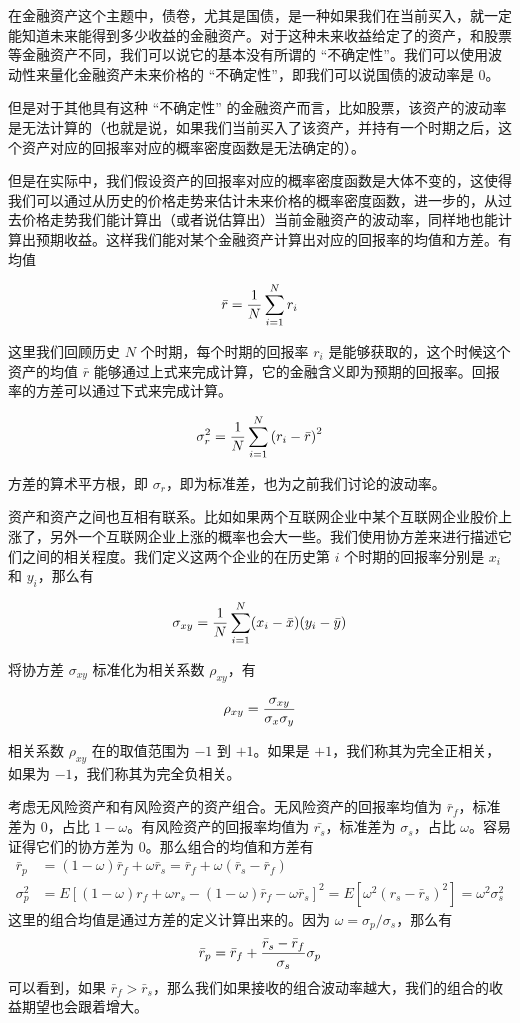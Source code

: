 \documentclass[utf8,a4paper,nofonts]{ctexbook}
\begin{document}
在金融资产这个主题中，债卷，尤其是国债，是一种如果我们在当前买入，就一定能知道未来能得到多少收益的金融资产。对于这种未来收益给定了的资产，和股票等金融资产不同，我们可以说它的基本没有所谓的 “不确定性”。我们可以使用波动性来量化金融资产未来价格的 “不确定性”，即我们可以说国债的波动率是 0。

但是对于其他具有这种 “不确定性” 的金融资产而言，比如股票，该资产的波动率是无法计算的（也就是说，如果我们当前买入了该资产，并持有一个时期之后，这个资产对应的回报率对应的概率密度函数是无法确定的）。

但是在实际中，我们假设资产的回报率对应的概率密度函数是大体不变的，这使得我们可以通过从历史的价格走势来估计未来价格的概率密度函数，进一步的，从过去价格走势我们能计算出（或者说估算出）当前金融资产的波动率，同样地也能计算出预期收益。这样我们能对某个金融资产计算出对应的回报率的均值和方差。有均值

$$
\bar{r} = {1 \over N}\sum_{i = 1}^{N} r_i
$$

这里我们回顾历史 $N$ 个时期，每个时期的回报率 $r_i$ 是能够获取的，这个时候这个资产的均值 $\bar{r}$ 能够通过上式来完成计算，它的金融含义即为预期的回报率。回报率的方差可以通过下式来完成计算。

$$
\sigma_r^2 = {1 \over N}\sum_{i = 1}^{N} \left( r_i - \bar{r} \right)^2
$$

方差的算术平方根，即 $\sigma_r$，即为标准差，也为之前我们讨论的波动率。

资产和资产之间也互相有联系。比如如果两个互联网企业中某个互联网企业股价上涨了，另外一个互联网企业上涨的概率也会大一些。我们使用协方差来进行描述它们之间的相关程度。我们定义这两个企业的在历史第 $i$ 个时期的回报率分别是 $x_i$ 和 $y_i$，那么有

$$
\sigma_{xy} = {1 \over N} \sum_{i = 1}^{N} (x_i - \bar{x}) (y_i - \bar{y})
$$

将协方差 $\sigma_{xy}$ 标准化为相关系数 $\rho_{xy}$，有

$$
\rho_{xy} = {\sigma_{xy} \over \sigma_x \sigma_y}
$$

相关系数 $\rho_{xy}$ 在的取值范围为 $-1$ 到 $+1$。如果是 $+1$，我们称其为完全正相关，如果为 $-1$，我们称其为完全负相关。

考虑无风险资产和有风险资产的资产组合。无风险资产的回报率均值为 $\bar{r}_f$，标准差为 $0$，占比 $1 - \omega$。有风险资产的回报率均值为 $\bar{r_s}$，标准差为 $\sigma_s$，占比 $\omega$。容易证得它们的协方差为 $0$。那么组合的均值和方差有
\begin{align*}
    \bar{r}_p  & = (1 - \omega) \bar{r}_f + \omega \bar{r}_s = \bar{r}_f + \omega(\bar{r}_s - \bar{r}_f) \\
    \sigma_p^2 & = E\left[ (1 - \omega) r_f + \omega r_s - (1 - \omega) \bar{r}_f - \omega \bar{r}_s \right]^2 = E\left[ \omega^2 (r_s - \bar{r}_s)^2 \right] = \omega^2 \sigma_s^2
\end{align*}
这里的组合均值是通过方差的定义计算出来的。因为 $\omega = \sigma_p / \sigma_s$，那么有
\[
    \bar{r}_p = \bar{r}_f + {\bar{r}_s - \bar{r}_f \over \sigma_s} \sigma_p
\]
可以看到，如果 $\bar{r}_f > \bar{r}_s$，那么我们如果接收的组合波动率越大，我们的组合的收益期望也会跟着增大。
\end{document}
